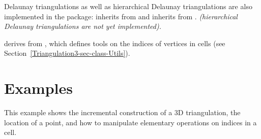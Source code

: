 Delaunay triangulations as well as hierarchical Delaunay triangulations
\cite{d-iirdt-98} are also implemented in the package: 
 inherits from 
 and 
 inherits from 
. \textit{(hierarchical
Delaunay triangulations are not yet implemented).} 

 derives from
, which defines tools on
the indices of vertices in cells (see
Section~\ref{Triangulation3-sec-class-Utils}). 

\section{Examples}
\label{Triangulation3-sec-examples}
This example shows the incremental construction of a 3D triangulation, 
the location of a point, and how to manipulate elementary operations
on indices in a cell.

